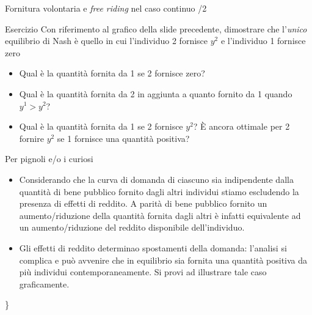 \documentclass[aspectratio=149,11pt]{beamer}
\begin{document}
\begin{frame}{Fornitura volontaria e \emph{free riding} nel caso continuo /2}
\begin{block}{Esercizio}
\small
Con riferimento al grafico della slide precedente, dimostrare che l'\emph{unico}
equilibrio di Nash è quello in cui l'individuo 2 fornisce $y^{2}$ e
l'individuo 1 fornisce zero
\end{block}
\small
\begin{itemize}
\item Qual è la quantità fornita da 1 se 2 fornisce zero?
\item Qual è la quantità fornita da 2 in aggiunta a quanto fornito da 1
quando $y^{1}>y^{2}$?
\item Qual è la quantità fornita da 1 se 2 fornisce $y^{2}$? È ancora
ottimale per 2 fornire $y^{2}$ se 1 fornisce una quantità positiva?
\end{itemize}
\begin{block}{Per pignoli e/o i curiosi}
\footnotesize
\begin{itemize}
\item Considerando che la curva di domanda di ciascuno sia indipendente dalla
quantità di bene pubblico fornito dagli altri individui stiamo escludendo la
presenza di effetti di reddito. A parità di bene pubblico fornito un
aumento/riduzione della quantità fornita dagli altri è infatti
equivalente ad un aumento/riduzione del reddito disponibile dell'individuo.
\item Gli effetti di reddito determinao spostamenti della domanda: l'analisi si
complica e può avvenire che in equilibrio sia fornita una quantità positiva
da più individui contemporaneamente. Si provi ad illustrare tale caso
graficamente.
\end{itemize}
\}
\end{block}
\end{frame}
\end{document}
